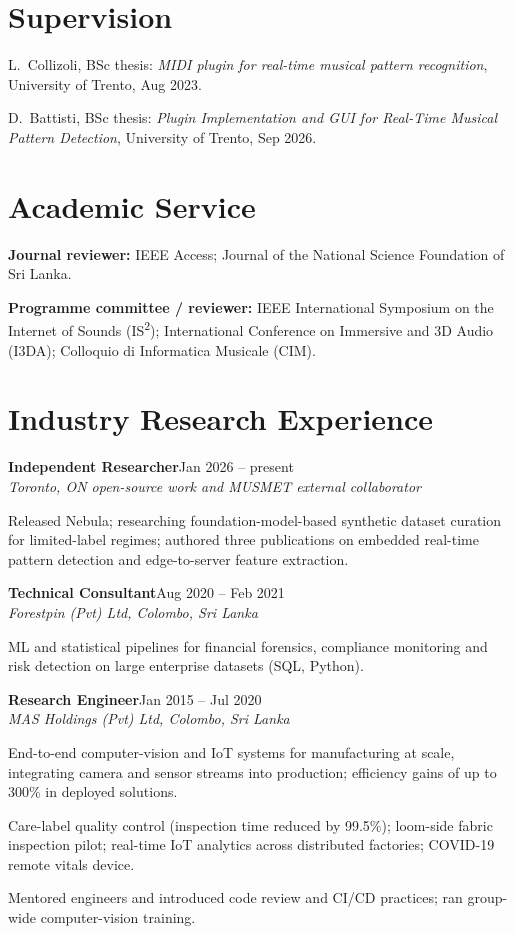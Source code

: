 \documentclass[11pt]{article}
\newcommand{\entry}[3]{%
  \par\noindent\textbf{#1}\hfill #2\\
  \noindent\textit{#3}\par\vspace{0.15em}}
\begin{document}
\section*{Supervision}
\begin{cvlist}
  \item L.\ Collizoli, BSc thesis: \textit{MIDI plugin for real-time musical pattern recognition}, University of Trento, Aug 2023.
  \item D.\ Battisti, BSc thesis: \textit{Plugin Implementation and GUI for Real-Time Musical Pattern Detection}, University of Trento, Sep 2026.
\end{cvlist}

\section*{Academic Service}
\begin{cvlist}
  \item \textbf{Journal reviewer:} IEEE Access; Journal of the National Science Foundation of Sri Lanka.
  \item \textbf{Programme committee / reviewer:} IEEE International Symposium on the Internet of Sounds (IS\textsuperscript{2}); International Conference on Immersive and 3D Audio (I3DA); Colloquio di Informatica Musicale (CIM).
\end{cvlist}

\section*{Industry Research Experience}
\entry{Independent Researcher}{Jan 2026 -- present}{Toronto, ON \textbar{} open-source work and MUSMET external collaborator}
\begin{cvlist}
  \item Released Nebula; researching foundation-model-based synthetic dataset curation for limited-label regimes; authored three publications on embedded real-time pattern detection and edge-to-server feature extraction.
\end{cvlist}
\entry{Technical Consultant}{Aug 2020 -- Feb 2021}{Forestpin (Pvt) Ltd, Colombo, Sri Lanka}
\begin{cvlist}
  \item ML and statistical pipelines for financial forensics, compliance monitoring and risk detection on large enterprise datasets (SQL, Python).
\end{cvlist}
\entry{Research Engineer}{Jan 2015 -- Jul 2020}{MAS Holdings (Pvt) Ltd, Colombo, Sri Lanka}
\begin{cvlist}
  \item End-to-end computer-vision and IoT systems for manufacturing at scale, integrating camera and sensor streams into production; efficiency gains of up to 300\% in deployed solutions.
  \item Care-label quality control (inspection time reduced by 99.5\%); loom-side fabric inspection pilot; real-time IoT analytics across distributed factories; COVID-19 remote vitals device.
  \item Mentored engineers and introduced code review and CI/CD practices; ran group-wide computer-vision training.
\end{cvlist}
\end{document}
